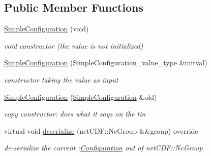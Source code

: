 \subsection*{Public Member Functions}
\begin{DoxyCompactItemize}
\item 
\mbox{\label{class_s_m_spp__di__unipi__it_1_1_simple_configuration_a2e1bb59cd2203ec5aa8f4b891fbd9138}} 
\mbox{\hyperlink{class_s_m_spp__di__unipi__it_1_1_simple_configuration_a2e1bb59cd2203ec5aa8f4b891fbd9138}{Simple\+Configuration}} (void)
\begin{DoxyCompactList}\small\item\em void constructor (the value is not initialized) \end{DoxyCompactList}\item 
\mbox{\label{class_s_m_spp__di__unipi__it_1_1_simple_configuration_a3ece5629247f42d227fb214f472b7f7f}} 
\mbox{\hyperlink{class_s_m_spp__di__unipi__it_1_1_simple_configuration_a3ece5629247f42d227fb214f472b7f7f}{Simple\+Configuration}} (Simple\+Configuration\+\_\+value\+\_\+type \&initval)
\begin{DoxyCompactList}\small\item\em constructor taking the value as input \end{DoxyCompactList}\item 
\mbox{\label{class_s_m_spp__di__unipi__it_1_1_simple_configuration_a99c5224d7d7f8c66bb8e4e46109d0f69}} 
\mbox{\hyperlink{class_s_m_spp__di__unipi__it_1_1_simple_configuration_a99c5224d7d7f8c66bb8e4e46109d0f69}{Simple\+Configuration}} (\mbox{\hyperlink{class_s_m_spp__di__unipi__it_1_1_simple_configuration}{Simple\+Configuration}} \&old)
\begin{DoxyCompactList}\small\item\em copy constructor\+: does what it says on the tin \end{DoxyCompactList}\item 
virtual void \mbox{\hyperlink{class_s_m_spp__di__unipi__it_1_1_simple_configuration_a828ece608e8a4a497f43d3d6bb75af40}{deserialize}} (net\+C\+D\+F\+::\+Nc\+Group \&\&group) override
\begin{DoxyCompactList}\small\item\em de-\/serialize the current \+:\mbox{\hyperlink{class_s_m_spp__di__unipi__it_1_1_configuration}{Configuration}} out of net\+C\+D\+F\+::\+Nc\+Group \end{DoxyCompactList}\item 

\end{DoxyCompactItemize}
